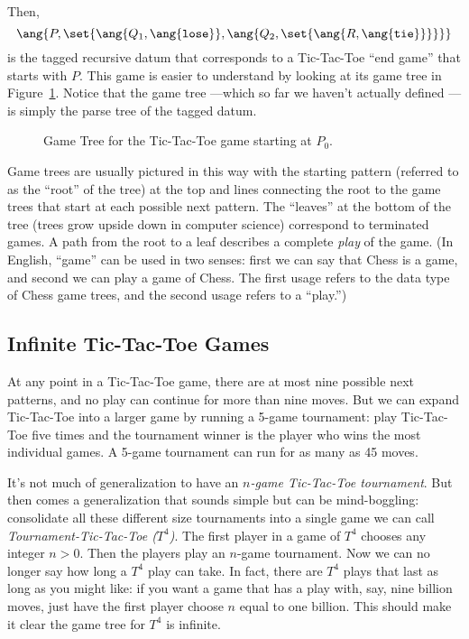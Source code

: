 \begin{definition}
\begin{staffnotes}

Then,
\begin{equation}\label{endgame}
\ang{P, \set{\ang{Q_1, \ang{\texttt{lose}}},
             \ang{Q_2, \set{\ang{R,\ang{\texttt{tie}}}}}}}
\end{equation}
is the tagged recursive datum that corresponds to a Tic-Tac-Toe ``end
game'' that starts with $P$.  This game is easier to understand by looking
at its game tree in Figure~\ref{fig:endgame}.  Notice that the game tree
---which so far we haven't actually defined ---is simply the parse tree of
the tagged datum.

\end{staffnotes}

\begin{figure}[htbp]
\caption{Game Tree for the Tic-Tac-Toe game starting at $P_0$.}
\label{fig:endgame}
\end{figure}

Game trees are usually pictured in this way with the starting pattern
(referred to as the ``root'' of the tree) at the top and lines connecting
the root to the \iffalse roots of the \fi game trees that start at each
possible next pattern.  The ``leaves'' at the bottom of the tree (trees
grow upside down in computer science) correspond to terminated games.  A
path from the root to a leaf describes a complete \emph{play} of the game.
(In English, ``game'' can be used in two senses: first we can say that
Chess is a game, and second we can play a game of Chess.  The first usage
refers to the data type of Chess game trees, and the second usage refers to
a ``play.'')

\subsection{Infinite Tic-Tac-Toe Games}

At any point in a Tic-Tac-Toe game, there are at most nine possible
next patterns, and no play can continue for more than nine moves.  But
we can expand Tic-Tac-Toe into a larger game by running a 5-game
tournament: play Tic-Tac-Toe five times and the tournament winner is
the player who wins the most individual games.  A 5-game tournament
can run for as many as 45 moves.

It's not much of generalization to have an \emph{$n$-game Tic-Tac-Toe
  tournament}.  But then comes a generalization that sounds simple but can
be mind-boggling: consolidate all these different size tournaments into a
single game we can call \emph{Tournament-Tic-Tac-Toe ($T^4$)}.  The first
player in a game of $T^4$ chooses any integer $n > 0$.  Then the players
play an $n$-game tournament.  Now we can no longer say how long a $T^4$
play can take.  In fact, there are $T^4$ plays that last as long as you
might like: if you want a game that has a play with, say, nine billion
moves, just have the first player choose $n$ equal to one billion.  This
should make it clear the game tree for $T^4$ is infinite.


\end{definition}
